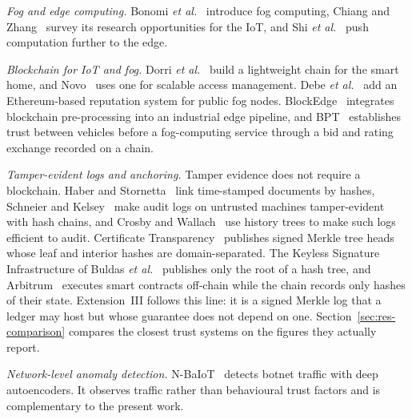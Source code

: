 \emph{Fog and edge computing.}  Bonomi \textit{et
al.}~\cite{bonomi2012fog} introduce fog computing, Chiang and
Zhang~\cite{chiang2016fog} survey its research opportunities for the
IoT, and Shi \textit{et
al.}~\cite{shi2016edge} push computation further to the edge.

\emph{Blockchain for IoT and fog.}  Dorri \textit{et
al.}~\cite{dorri2017blockchain} build a lightweight chain for the smart
home, and Novo~\cite{novo2018blockchain} uses one for scalable access
management.  Debe \textit{et
al.}~\cite{debe2019iot} add an Ethereum-based reputation system for
public fog nodes.  BlockEdge~\cite{kumar2020blockedge} integrates
blockchain pre-processing into an industrial edge pipeline, and
BPT~\cite{dewanta2021bpt} establishes trust between vehicles before a
fog-computing service through a bid and rating exchange recorded on a
chain.

\emph{Tamper-evident logs and anchoring.}  Tamper evidence does not
require a blockchain.  Haber and Stornetta~\cite{haber1991time} link
time-stamped documents by hashes, Schneier and
Kelsey~\cite{schneier1999secure} make audit logs on untrusted machines
tamper-evident with hash chains, and Crosby and
Wallach~\cite{crosby2009efficient} use history trees to make such logs
efficient to audit.  Certificate
Transparency~\cite{laurie2013rfc6962} publishes signed Merkle tree
heads whose leaf and interior hashes are domain-separated.  The
Keyless Signature Infrastructure of Buldas \textit{et
al.}~\cite{buldas2013ksi} publishes only the root of a hash tree, and
Arbitrum~\cite{kalodner2018arbitrum} executes smart contracts
off-chain while the chain records only hashes of their state.
Extension~III follows this line: it is a signed Merkle log that a
ledger may host but whose guarantee does not depend on one.
Section~\ref{sec:res-comparison} compares the closest trust systems on
the figures they actually report.

\emph{Network-level anomaly detection.}  N-BaIoT~\cite{meidan2018nbaiot}
detects botnet traffic with deep autoencoders.  It observes traffic
rather than behavioural trust factors and is complementary to the
present work.

